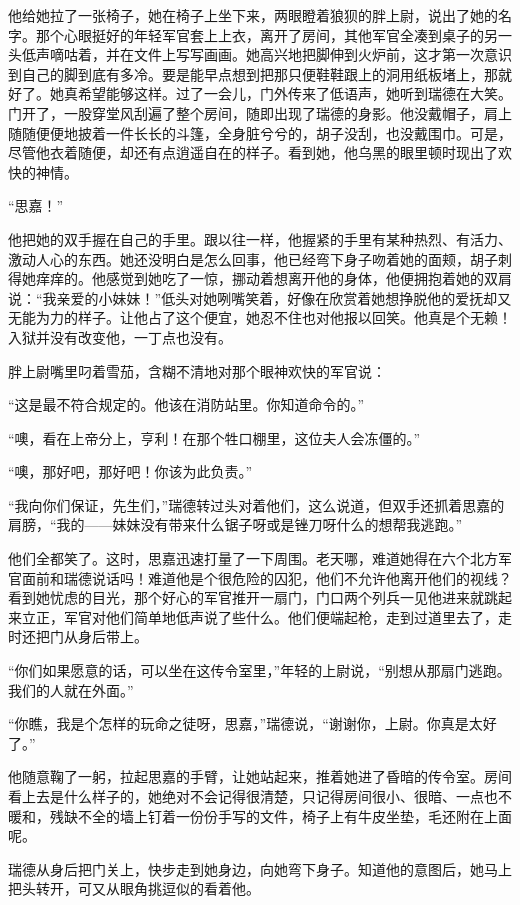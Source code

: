 \par 他给她拉了一张椅子，她在椅子上坐下来，两眼瞪着狼狈的胖上尉，说出了她的名字。那个心眼挺好的年轻军官套上上衣，离开了房间，其他军官全凑到桌子的另一头低声嘀咕着，并在文件上写写画画。她高兴地把脚伸到火炉前，这才第一次意识到自己的脚到底有多冷。要是能早点想到把那只便鞋鞋跟上的洞用纸板堵上，那就好了。她真希望能够这样。过了一会儿，门外传来了低语声，她听到瑞德在大笑。门开了，一股穿堂风刮遍了整个房间，随即出现了瑞德的身影。他没戴帽子，肩上随随便便地披着一件长长的斗篷，全身脏兮兮的，胡子没刮，也没戴围巾。可是，尽管他衣着随便，却还有点逍遥自在的样子。看到她，他乌黑的眼里顿时现出了欢快的神情。
\par “思嘉！”
\par 他把她的双手握在自己的手里。跟以往一样，他握紧的手里有某种热烈、有活力、激动人心的东西。她还没明白是怎么回事，他已经弯下身子吻着她的面颊，胡子刺得她痒痒的。他感觉到她吃了一惊，挪动着想离开他的身体，他便拥抱着她的双肩说：“我亲爱的小妹妹！”低头对她咧嘴笑着，好像在欣赏着她想挣脱他的爱抚却又无能为力的样子。让他占了这个便宜，她忍不住也对他报以回笑。他真是个无赖！入狱并没有改变他，一丁点也没有。
\par 胖上尉嘴里叼着雪茄，含糊不清地对那个眼神欢快的军官说：
\par “这是最不符合规定的。他该在消防站里。你知道命令的。”
\par “噢，看在上帝分上，亨利！在那个牲口棚里，这位夫人会冻僵的。”
\par “噢，那好吧，那好吧！你该为此负责。”
\par “我向你们保证，先生们，”瑞德转过头对着他们，这么说道，但双手还抓着思嘉的肩膀，“我的——妹妹没有带来什么锯子呀或是锉刀呀什么的想帮我逃跑。”
\par 他们全都笑了。这时，思嘉迅速打量了一下周围。老天哪，难道她得在六个北方军官面前和瑞德说话吗！难道他是个很危险的囚犯，他们不允许他离开他们的视线？看到她忧虑的目光，那个好心的军官推开一扇门，门口两个列兵一见他进来就跳起来立正，军官对他们简单地低声说了些什么。他们便端起枪，走到过道里去了，走时还把门从身后带上。
\par “你们如果愿意的话，可以坐在这传令室里，”年轻的上尉说，“别想从那扇门逃跑。我们的人就在外面。”
\par “你瞧，我是个怎样的玩命之徒呀，思嘉，”瑞德说，“谢谢你，上尉。你真是太好了。”
\par 他随意鞠了一躬，拉起思嘉的手臂，让她站起来，推着她进了昏暗的传令室。房间看上去是什么样子的，她绝对不会记得很清楚，只记得房间很小、很暗、一点也不暖和，残缺不全的墙上钉着一份份手写的文件，椅子上有牛皮坐垫，毛还附在上面呢。
\par 瑞德从身后把门关上，快步走到她身边，向她弯下身子。知道他的意图后，她马上把头转开，可又从眼角挑逗似的看着他。
